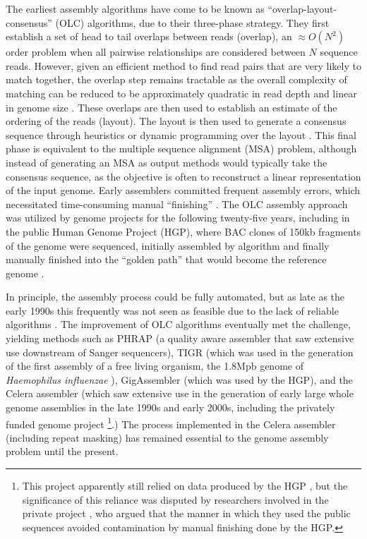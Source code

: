 The earliest assembly algorithms have come to be known as ``overlap-layout-consensus'' (OLC) algorithms, due to their three-phase strategy.
They first establish a set of head to tail overlaps between reads (overlap), an $\approx O(N^{2})$ order problem when all pairwise relationships are considered between $N$ sequence reads.
However, given an efficient method to find read pairs that are very likely to match together, the overlap step remains tractable as the overall complexity of matching can be reduced to be approximately quadratic in read depth and linear in genome size \cite{huang1992contig}.
These overlaps are then used to establish an estimate of the ordering of the reads (layout).
The layout is then used to generate a consensus sequence through heuristics or dynamic programming over the layout \cite{kececioglu1995combinatorial}.
This final phase is equivalent to the multiple sequence alignment (MSA) problem, although instead of generating an MSA as output methods would typically take the consensus sequence, as the objective is often to reconstruct a linear representation of the input genome.
Early assemblers committed frequent assembly errors, which necessitated time-consuming manual ``finishing'' \cite{gordon1998consed}.
The OLC assembly approach was utilized by genome projects for the following twenty-five years, including in the public Human Genome Project (HGP), where BAC clones of 150kb fragments of the genome were sequenced, initially assembled by algorithm and finally manually finished into the ``golden path'' that would become the reference genome \cite{international2001initial}.

In principle, the assembly process could be fully automated, but as late as the early 1990s this frequently was not seen as feasible due to the lack of reliable algorithms \cite{mahy1991sequencing}.
The improvement of OLC algorithms eventually met the challenge, yielding methods such as PHRAP \cite{green1999phrap} (a quality aware assembler that saw extensive use downstream of Sanger sequencers), TIGR \cite{sutton1995tigr} (which was used in the generation of the first assembly of a free living organism, the 1.8Mpb genome of \emph{Haemophilus influenzae} \cite{fleischmann1995whole}), GigAssembler \cite{kent2001assembly} (which was used by the HGP), and the Celera assembler \cite{myers2000whole,miller2008aggressive} (which saw extensive use in the generation of early large whole genome assemblies in the late 1990s and early 2000s, including the privately funded genome project \cite{venter2001sequence}\footnote{This project apparently still relied on data produced by the HGP \cite{waterston2002sequencing}, but the significance of this reliance was disputed by researchers involved in the private project \cite{myers2002sequencing}, who argued that the manner in which they used the public sequences avoided contamination by manual finishing done by the HGP.}.)
The process implemented in the Celera assembler (including repeat masking) has remained essential to the genome assembly problem until the present.

